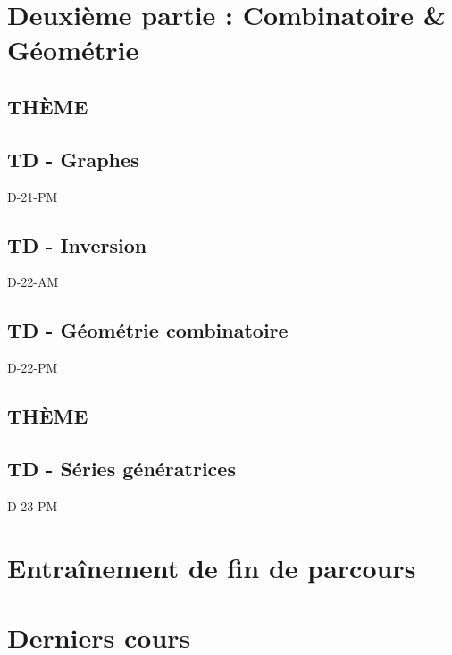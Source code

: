 \documentclass[poly,trombi]{valbonne}
\begin{document}


\section{Deuxième partie : Combinatoire \& Géométrie}

\subsection{THÈME}


\subsection{TD - Graphes}

{D-21-PM}

\subsection{TD - Inversion}

{D-22-AM}

\subsection{TD - Géométrie combinatoire}

{D-22-PM}

\subsection{THÈME}


\subsection{TD - Séries génératrices}

{D-23-PM}


\section{Entraînement de fin de parcours}



\section{Derniers cours}
\end{document}
